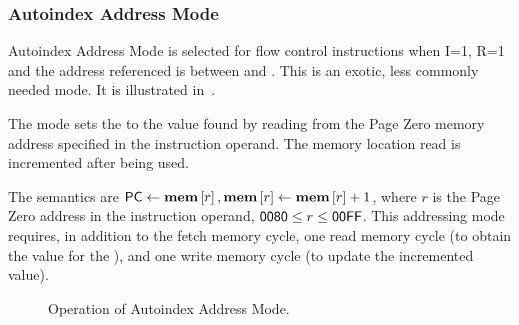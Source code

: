 






\subsubsection{Autoindex Address Mode}
\label{autoindex-address-mode}

Autoindex Address Mode is selected for flow control instructions when
I=1, R=1 and the address referenced is between  and
. This is an exotic, less commonly needed mode. It is
illustrated in~.

The mode sets the \PC to the value found by reading from the \gls{Page
  Zero} memory address specified in the instruction operand. The
memory location read is incremented after being used.

The semantics are $\mbox{\PC}\eq\mem{r}, \mem{r}\eq\mem{r}+1$, where
$r$ is the Page Zero address in the instruction operand,
$\mbox{\textsf{0080}}\leq r\leq \mbox{\textsf{00FF}}$. This addressing mode
requires, in addition to the fetch memory cycle, one read memory cycle
(to obtain the value for the \PC), and one write memory cycle (to
update the incremented value).

\begin{figure}[htb]
 \centering
     
\caption[Autoindex Address Mode]{\label{fig:autoindex-address-mode} Operation
  of Autoindex Address Mode.}
\end{figure}



